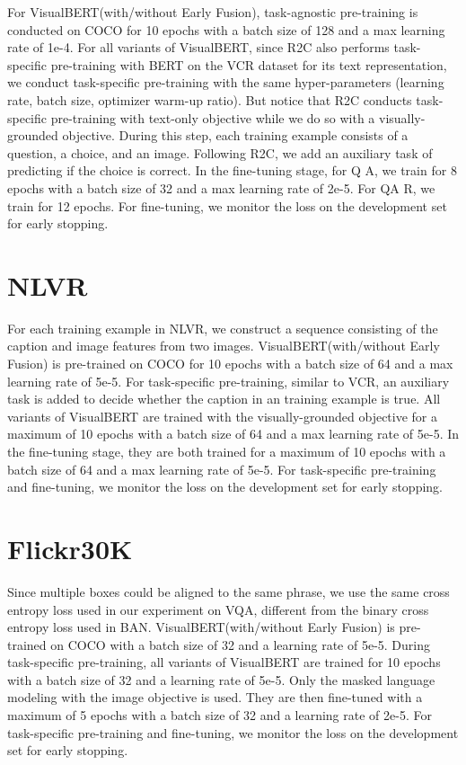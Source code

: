 \documentclass{article} \usepackage{iclr2019_conference,times}
\newcommand{\model}{VisualBERT\xspace}
\newcommand{\nlvr}{NLVR\xspace}
\newcommand{\bert}{BERT\xspace}
\begin{document}
For \model (with/without Early Fusion), task-agnostic pre-training is conducted on COCO for 10 epochs with a batch size of 128 and a max learning rate of 1e-4. For all variants of \model, since R2C also performs task-specific pre-training with \bert on the VCR dataset for its text representation, we conduct task-specific pre-training with the same hyper-parameters (learning rate, batch size, optimizer warm-up ratio).
But notice that R2C conducts task-specific pre-training with text-only objective while we do so with a visually-grounded objective. 
During this step, each training example consists of a question, a choice, and an image.
Following R2C, we add an auxiliary task of predicting if the choice is correct. In the fine-tuning stage, for Q  A, we train for 8 epochs with a batch size of 32 and a max learning rate of 2e-5. For QA  R, we train for 12 epochs. For fine-tuning, we monitor the loss on the development set for early stopping.


\section{\nlvr}\label{appendix:nlvr}
For each training example in \nlvr, we construct a sequence consisting of the caption and image features from two images.
\model (with/without Early Fusion) is pre-trained on COCO for 10 epochs with a batch size of 64 and a max learning rate of 5e-5. 
For task-specific pre-training, similar to VCR, an auxiliary task is added to decide whether the caption in an training example is true.
All variants of \model are trained with the visually-grounded objective for a maximum of 10 epochs with a batch size of 64 and a max learning rate of 5e-5. In the fine-tuning stage, they are both trained for a maximum of 10 epochs with a batch size of 64 and a max learning rate of 5e-5.
For task-specific pre-training and fine-tuning, we monitor the loss on the development set for early stopping.

\section{Flickr30K}\label{appendix:flickr}
Since multiple boxes could be aligned to the same phrase, we use the same cross entropy loss used in our experiment on VQA, different from the binary cross entropy loss used in BAN.
\model (with/without Early Fusion) is pre-trained on COCO with a batch size of 32 and a learning rate of 5e-5.
During task-specific pre-training, all variants of \model are trained for 10 epochs with a batch size of 32 and a learning rate of 5e-5.
Only the masked language modeling with the image objective is used.
They are then fine-tuned with a maximum of 5 epochs with a batch size of 32 and a learning rate of 2e-5.
For task-specific pre-training and fine-tuning, we monitor the loss on the development set for early stopping. 
\end{document}
